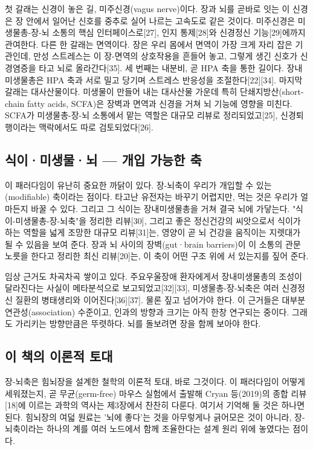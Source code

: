 \documentclass[12pt,oneside]{book}
\begin{document}
첫 갈래는 신경이 놓은 길, 미주신경(vagus nerve)이다. 장과 뇌를 곧바로 잇는 이 신경은 장 안에서 일어난 신호를 중추로 실어 나르는 고속도로 같은 것이다. 미주신경은 미생물총-장-뇌 소통의 핵심 인터페이스로[27], 인지 통제[28]와 신경정신 기능[29]에까지 관여한다. 다른 한 갈래는 면역이다. 장은 우리 몸에서 면역이 가장 크게 자리 잡은 기관인데, 만성 스트레스는 이 장-면역의 상호작용을 흔들어 놓고, 그렇게 생긴 신호가 신경염증을 타고 뇌로 올라간다[35]. 세 번째는 내분비, 곧 HPA 축을 통한 길이다. 장내미생물총은 HPA 축과 서로 밀고 당기며 스트레스 반응성을 조절한다[22][34]. 마지막 갈래는 대사산물이다. 미생물이 만들어 내는 대사산물 가운데 특히 단쇄지방산(short-chain fatty acids, SCFA)은 장벽과 면역과 신경을 거쳐 뇌 기능에 영향을 미친다. SCFA가 미생물총-장-뇌 소통에서 맡는 역할은 대규모 리뷰로 정리되었고[25], 신경퇴행이라는 맥락에서도 따로 검토되었다[26].

\subsection{식이·미생물·뇌 — 개입 가능한 축}

이 패러다임이 유난히 중요한 까닭이 있다. 장-뇌축이 우리가 개입할 수 있는(modifiable) 축이라는 점이다. 타고난 유전자는 바꾸기 어렵지만, 먹는 것은 우리가 얼마든지 바꿀 수 있다. 그리고 그 식이는 장내미생물총을 거쳐 결국 뇌에 가닿는다. "식이-미생물총-장-뇌축"을 정리한 리뷰[30], 그리고 좋은 정신건강의 씨앗으로서 식이가 하는 역할을 넓게 조망한 대규모 리뷰[31]는, 영양이 곧 뇌 건강을 움직이는 지렛대가 될 수 있음을 보여 준다. 장과 뇌 사이의 장벽(gut·brain barriers)이 이 소통의 관문 노릇을 한다고 정리한 최신 리뷰[20]는, 이 축이 어떤 구조 위에 서 있는지를 짚어 준다.

임상 근거도 차곡차곡 쌓이고 있다. 주요우울장애 환자에게서 장내미생물총의 조성이 달라진다는 사실이 메타분석으로 보고되었고[32][33], 미생물총-장-뇌축은 여러 신경정신 질환의 병태생리와 이어진다[36][37]. 물론 짚고 넘어가야 한다. 이 근거들은 대부분 연관성(association) 수준이고, 인과의 방향과 크기는 아직 한창 연구되는 중이다. 그래도 가리키는 방향만큼은 뚜렷하다. 뇌를 돌보려면 장을 함께 보아야 한다.

\subsection{이 책의 이론적 토대}

장-뇌축은 힘뇌장을 설계한 철학의 이론적 토대, 바로 그것이다. 이 패러다임이 어떻게 세워졌는지, 곧 무균(germ-free) 마우스 실험에서 출발해 Cryan 등(2019)의 종합 리뷰[18]에 이르는 과학의 역사는 제3장에서 찬찬히 다룬다. 여기서 기억해 둘 것은 하나면 된다. 힘뇌장의 여덟 원료는 '뇌에 좋다'는 것을 아무렇게나 긁어모은 것이 아니라, 장-뇌축이라는 하나의 계를 여러 노드에서 함께 조율한다는 설계 원리 위에 놓였다는 점이다.
\end{document}
